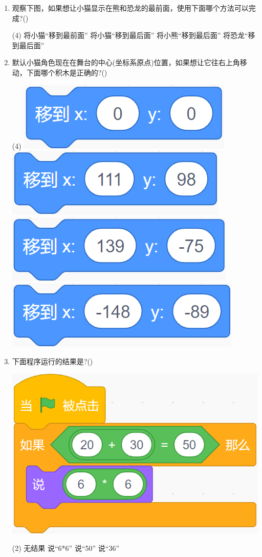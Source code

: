 \documentclass[10pt, a4paper]{article}
\begin{document}
\begin{enumerate}
        \item 观察下图，如果想让小猫显示在熊和恐龙的最前面，使用下面哪个方法可以完成?(\qquad)
        \begin{tasks}(4)
            \task 将小猫“移到最前面”
            \task 将小猫“移到最后面”
            \task 将小熊“移到最后面”
            \task 将恐龙“移到最后面”
        \end{tasks}

        \item 默认小猫角色现在在舞台的中心(坐标系原点)位置，如果想让它往右上角移动，下面哪个积木是正确的?(\qquad)
        \begin{tasks}(4)
            \task \includegraphics[width=.15\textwidth]{4a.png}
            \task \includegraphics[width=.15\textwidth]{4b.png}
            \task \includegraphics[width=.15\textwidth]{4c.png}
            \task \includegraphics[width=.15\textwidth]{4d.png}
        \end{tasks}

        \item 下面程序运行的结果是?(\qquad)
        
        \begin{minipage}{.3\textwidth}
            \includegraphics[width=.6\textwidth]{5.png}
        \end{minipage}
        \begin{minipage}{.6\textwidth}
            \begin{tasks}(2)
                \task 无结果
                \task 说“6*6”
                \task 说“50”
                \task 说“36”
            \end{tasks}
        \end{minipage}


\end{enumerate}
\end{document}

